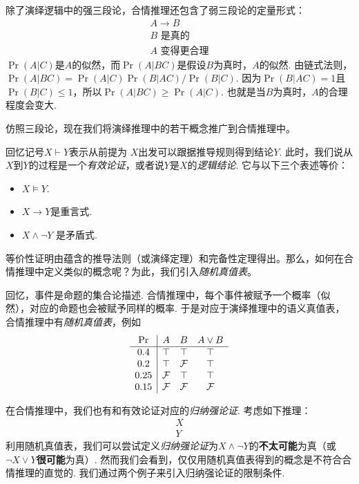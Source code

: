 除了演绎逻辑中的强三段论，合情推理还包含了弱三段论的定量形式：
    \[\begin{array}{c}  
            A \to B \\ B\text{ 是真的} \\ \hline A\text{ 变得更合理}
        \end{array}\]
$\Pr(A|C)$是$A$的似然，而$\Pr(A|BC)$是假设$B$为真时，$A$的似然. 由链式法则，$\Pr(A|BC) = \Pr(A|C)\Pr(B|AC)/\Pr(B|C)$. 因为$\Pr(B|AC) = 1$且$\Pr(B|C)\leq 1$，所以$\Pr(A|BC) \geq \Pr(A|C)$. 也就是当$B$为真时，$A$的合理程度会变大.

仿照三段论，现在我们将演绎推理中的若干概念推广到合情推理中。

回忆记号$X\vdash Y$表示从前提为 $X$出发可以跟据推导规则得到结论$Y$. 此时，我们说从$X$到$Y$的过程是一个\emph{有效论证}，或者说$Y$是$X$的\emph{逻辑结论}. 它与以下三个表述等价：
    \begin{itemize}
        \item $X\models Y$.
        \item  $X\to Y$是重言式.
        \item $X\wedge \lnot Y$ 是矛盾式.
    \end{itemize}
等价性证明由蕴含的推导法则（或演绎定理）和完备性定理得出。那么，如何在合情推理中定义类似的概念呢？为此，我们引入\emph{随机真值表}。

回忆，事件是命题的集合论描述. 合情推理中，每个事件被赋予一个概率（似然），对应的命题也会被赋予同样的概率. 于是对应于演绎推理中的语义真值表，合情推理中有\emph{随机真值表}，例如
\[
\begin{array}{c|ccc}
    \Pr & A & B & A\vee B \\ \hline
    0.4 & \top & \top & \top \\ 
    0.2 & \top & \mathcal{F} & \top \\ 
    0.25 & \mathcal{F} & \top & \top \\
    0.15 & \mathcal{F} & \mathcal{F} & \mathcal{F} \\
\end{array}
\]

在合情推理中，我们也有和有效论证对应的\emph{归纳强论证}. 考虑如下推理：
	\[\begin{array}{c}
	     X\\\hline
	     Y
	\end{array}\]
利用随机真值表，我们可以尝试定义\emph{归纳强论证}为$X\wedge\neg Y$的\textbf{不太可能}为真（或$\neg X\vee Y$\textbf{很可能}为真）. 然而我们会看到，仅仅用随机真值表得到的概念是不符合合情推理的直觉的. 我们通过两个例子来引入归纳强论证的限制条件.



